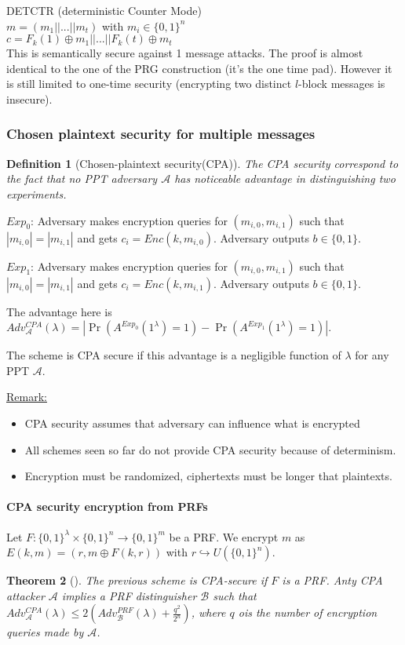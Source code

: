 \documentclass{article}
\newtheorem{thm}{Theorem}[section]
\newtheorem{defi}[thm]{Definition}
\newcommand{\Thm}[3]{\begin{thm}[#1]\label{#2}#3\end{thm}}
\newcommand{\Def}[3]{\begin{defi}[#1]\label{#2}#3\end{defi}}
\newcommand{\Rem}{\underline{Remark:} }
\newcommand{\A}{\mathcal{A}}
\newcommand{\B}{\mathcal{B}}
\newcommand{\bit}{\{0,1\}}
\begin{document}
DETCTR (deterministic Counter Mode)\\
$m=(m_1||...||m_t)$ with $m_i\in\bit^n$\\
$c=F_k(1)\oplus m_1||...||F_k(t)\oplus m_t$\\
This is semantically secure against 1 message attacks. The proof is almost identical to the one of the PRG construction (it's the one time pad). However it is still limited to one-time security (encrypting two distinct $l$-block messages is insecure).

\subsubsection{Chosen plaintext security for multiple messages}
\Def{Chosen-plaintext security(CPA)}{def:CPAsecure}{The CPA security correspond to the fact that no PPT adversary $\A$ has noticeable advantage in distinguishing two experiments.}

$Exp_0$: Adversary makes encryption queries for $(m_{i,0},m_{i,1})$ such that $|m_{i,0}|=|m_{i,1}|$ and gets $c_i=Enc(k,m_{i,0})$. Adversary outputs $b\in\bit$.

$Exp_1$: Adversary makes encryption queries for $(m_{i,0},m_{i,1})$ such that $|m_{i,0}|=|m_{i,1}|$ and gets $c_i=Enc(k,m_{i,1})$. Adversary outputs $b\in\bit$.

The advantage here is $Adv_\A^{CPA}(\lambda)=|\Pr(A^{Exp_0}(1^\lambda)=1)-\Pr(A^{Exp_1}(1^\lambda)=1)|$.

The scheme is CPA secure if this advantage is a negligible function of $\lambda$ for any PPT $\A$.

\Rem \begin{itemize}
\item CPA security assumes that adversary can influence what is encrypted
\item All schemes seen so far do not provide CPA security because of determinism.
\item Encryption must be randomized, ciphertexts must be longer that plaintexts.
\end{itemize}

\paragraph{CPA security encryption from PRFs} Let $F:\bit^\lambda\times\bit^n\rightarrow\bit^m$ be a PRF. We encrypt $m$ as $E(k,m)=(r,m\oplus F(k,r))$ with $r\hookrightarrow U(\bit^n)$.

\Thm{}{thm:CPAsecurePRF}{The previous scheme is CPA-secure if $F$ is a PRF. Anty CPA attacker $\A$ implies a PRF distinguisher $\B$ such that $Adv_\A^{CPA}(\lambda)\leq 2(Adv_\B^{PRF}(\lambda)+\frac{q^2}{2^n})$, where $q$ ois the number of encryption queries made by $\A$.}
\end{document}
